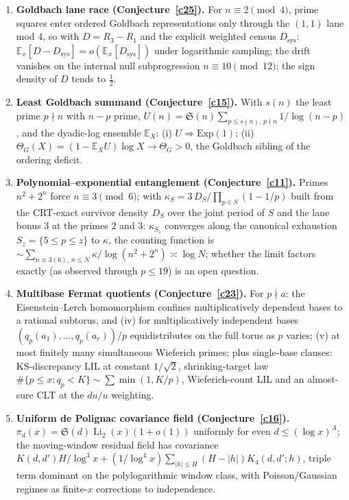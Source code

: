\documentclass[11pt]{article}
\theoremstyle{definition}
\newcommand{\Li}{\operatorname{Li}}
\newcommand{\SG}{\mathfrak S}
\begin{document}
\begin{enumerate}
\item \textbf{Goldbach lane race (Conjecture~\ref{c25}).}  For
$n\equiv2\pmod4$, prime squares enter ordered Goldbach
representations only through the $(1,1)$ lane mod $4$, so with
$D=R_3-R_1$ and the explicit weighted census $D_{\mathrm{sys}}$:
$\mathbb E_x[D-D_{\mathrm{sys}}]=o(\mathbb E_x[D_{\mathrm{sys}}])$
under logarithmic sampling; the drift vanishes on the internal null
subprogression $n\equiv10\pmod{12}$; the sign density of $D$ tends
to $\tfrac12$.

\item \textbf{Least Goldbach summand (Conjecture~\ref{c15}).}  With
$s(n)$ the least prime $p\nmid n$ with $n-p$ prime,
$U(n)=\SG(n)\sum_{p\le s(n),\,p\nmid n}1/\log(n-p)$, and the dyadic-log
ensemble $\mathbb E_X$: (i) $U\Rightarrow\mathrm{Exp}(1)$; (ii)
$\Theta_G(X)=(1-\mathbb E_XU)\log X\to\Theta_G>0$, the Goldbach
sibling of the ordering deficit.

\item \textbf{Polynomial--exponential entanglement
(Conjecture~\ref{c11}).}  Primes $n^2+2^n$ force $n\equiv3\pmod6$;
with $\kappa_S=3\,D_S/\prod_{p\in S}(1-1/p)$ built from the
CRT-exact survivor density $D_S$ over the joint period of $S$ and
the lane bonus $3$ at the primes $2$ and $3$: $\kappa_{S_z}$
converges along the canonical
exhaustion $S_z=\{5\le p\le z\}$ to $\kappa$, the counting function
is $\sim\sum_{n\equiv3(6),\,n\le N}\kappa/\log(n^2+2^n)\asymp\log
N$; whether the limit factors exactly (as observed through $p\le19$)
is an open question.

\item \textbf{Multibase Fermat quotients (Conjecture~\ref{c23}).}
For $p\nmid a$: the Eisenstein--Lerch homomorphism confines
multiplicatively dependent bases to a rational subtorus, and
(iv) for multiplicatively independent bases
$(q_p(a_1),\dots,q_p(a_r))/p$ equidistributes on the full torus as
$p$ varies; (v) at most finitely many simultaneous Wieferich primes;
plus single-base clauses: KS-discrepancy LIL at constant
$1/\sqrt2$, shrinking-target law
$\#\{p\le x:q_p<K\}\sim\sum\min(1,K/p)$, Wieferich-count LIL and an
almost-sure CLT at the $du/u$ weighting.

\item \textbf{Uniform de Polignac covariance field
(Conjecture~\ref{c16}).}  $\pi_d(x)=\SG(d)\Li_2(x)(1+o(1))$
uniformly for even $d\le(\log x)^A$; the moving-window residual
field has covariance
$K(d,d')H/\log^3x+(1/\log^4x)\sum_{|h|\le H}(H-|h|)K_4(d,d';h)$,
triple term dominant on the polylogarithmic window class, with
Poisson/Gaussian regimes as finite-$x$ corrections to independence.


\end{enumerate}
\end{document}
